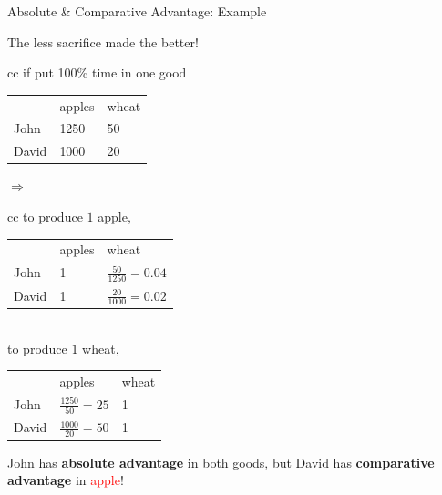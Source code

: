 \documentclass[11pt,aspectratio=43,usenames,dvipsnames]{beamer}
\newcommand{\red}[1]{\textcolor{red}{#1}}
\theoremstyle{definition}
\begin{document}
\begin{frame}{Absolute \& Comparative Advantage: Example}
\label{slide:Absolute____Comparative_Advantage__Example}

    \begin{center}
        The less sacrifice made the better!
    \end{center}

    \begin{tabular}{cc}
        if put 100\% time in one good
        \\
        \begin{tabular}{lll}
                & apples
                & wheat
            \\
            John
                & 1250
                & 50
            \\
            David
                & 1000
                & 20
            \\
        \end{tabular}
    \end{tabular}
    $ \Longrightarrow $
    \begin{tabular}{cc}
        to produce $ 1$ apple,
        \\
        \begin{tabular}{lll}
                & apples
                & wheat
            \\
            John
                & 1
                & $\frac{50}{1250} = 0.04$
            \\
            David
                & 1
                & $ \frac{20}{1000} = 0.02$ \checkmark
            \\
        \end{tabular}
        \\
        to produce $ 1$ wheat,
        \\
        \begin{tabular}{lll}
                & apples
                & wheat
            \\
            John
                & $ \frac{1250}{50} = 25 $ \checkmark
                & 1
            \\
            David
                & $ \frac{1000}{20} = 50$
                & 1
            \\
        \end{tabular}
    \end{tabular}

    \vspace{0.5em}

    John has \textbf{absolute advantage} in both goods, but David has \textbf{comparative advantage} in \red{apple}!

\end{frame}
\end{document}
